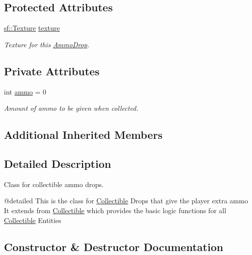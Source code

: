 \subsection*{Protected Attributes}
\begin{DoxyCompactItemize}
\item 
\mbox{\label{class_ammo_drop_af5ca5c431870dd7f5a3b0aa7eb0142be}} 
\mbox{\hyperlink{classsf_1_1_texture}{sf\+::\+Texture}} \mbox{\hyperlink{class_ammo_drop_af5ca5c431870dd7f5a3b0aa7eb0142be}{texture}}
\begin{DoxyCompactList}\small\item\em Texture for this \mbox{\hyperlink{class_ammo_drop}{Ammo\+Drop}}. \end{DoxyCompactList}\end{DoxyCompactItemize}
\subsection*{Private Attributes}
\begin{DoxyCompactItemize}
\item 
\mbox{\label{class_ammo_drop_ad7733f36ff1de83d065f0345e6c91220}} 
int \mbox{\hyperlink{class_ammo_drop_ad7733f36ff1de83d065f0345e6c91220}{ammo}} = 0
\begin{DoxyCompactList}\small\item\em Amount of ammo to be given when collected. \end{DoxyCompactList}\end{DoxyCompactItemize}
\subsection*{Additional Inherited Members}


\subsection{Detailed Description}
Class for collectible ammo drops. 

@detailed This is the class for \mbox{\hyperlink{class_collectible}{Collectible}} Drops that give the player extra ammo It extends from \mbox{\hyperlink{class_collectible}{Collectible}} which provides the basic logic functions for all \mbox{\hyperlink{class_collectible}{Collectible}} Entities 

\subsection{Constructor \& Destructor Documentation}
\mbox{\label{class_ammo_drop_a996b802f8aff9538d9a2b11f266eb39f}} 

